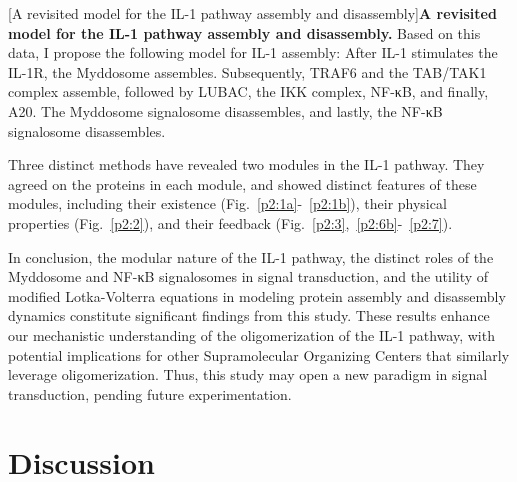 \begin{centering}
\captionsetup{parbox=none}
[A revisited model for the IL-1 pathway assembly and disassembly]{\textbf{A revisited model for the IL-1 pathway assembly and disassembly.} Based on this data, I propose the following model for IL-1 assembly: After IL-1 stimulates the IL-1R, the Myddosome assembles. Subsequently, TRAF6 and the TAB/TAK1 complex assemble, followed by LUBAC, the IKK complex, NF-κB, and finally, A20. The Myddosome signalosome disassembles, and lastly, the NF-κB signalosome disassembles.}
\label{p2:8}
\end{centering}

Three distinct methods have revealed two modules in the IL-1 pathway. They agreed on the proteins in each module, and showed distinct features of these modules, including their existence (Fig.~\ref{p2:1a}-~\ref{p2:1b}), their physical properties (Fig.~\ref{p2:2}), and their feedback (Fig.~\ref{p2:3},~\ref{p2:6b}-~\ref{p2:7}).

In conclusion, the modular nature of the IL-1 pathway, the distinct roles of the Myddosome and NF-κB signalosomes in signal transduction, and the utility of modified Lotka-Volterra equations in modeling protein assembly and disassembly dynamics constitute significant findings from this study. These results enhance our mechanistic understanding of the oligomerization of the IL-1 pathway, with potential implications for other Supramolecular Organizing Centers that similarly leverage oligomerization. Thus, this study may open a new paradigm in signal transduction, pending future experimentation.

\mygeometry
\part{Discussion}
\restoregeometry
